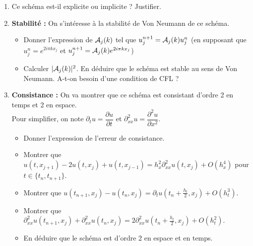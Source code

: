 \documentclass[12pt]{article}
\begin{document}
\begin{exo}
  \begin{enumerate}
  \item Ce sch\'ema est-il explicite ou implicite ? Justifier.
  \item {\bf Stabilit\'e : } On s'int\'eresse \`a la stabilit\'e de Von Neumann de ce sch\'ema.
    \begin{itemize}
    \item Donner l'expression de $\mathcal{A}_j(k)$ tel que $u_j^{n+1} = \mathcal{A}_j(k) u_j^n$
      (en supposant que $u_j^n = e^{2i \pi k x_j}$ et $u_j^{n+1} = \mathcal{A}_j(k) e^{2i \pi k x_j}$)
    \item Calculer $| \mathcal{A}_j(k) |^2$. En d\'eduire que le sch\'ema est stable au sens
      de Von Neumann. A-t-on besoin d'une condition de CFL ?
    \end{itemize}
  \item {\bf Consistance : } On va montrer que ce sch\'ema est consistant d'ordre 2 en temps
    et 2 en espace. \\
    Pour simplifier, on note $\partial_t u = \dfrac{\partial u}{\partial t}$
    et $\partial_{xx}^2 u = \dfrac{\partial^2 u}{\partial x^2}$.
    \begin{itemize}
    \item Donner l'expression de l'erreur de consistance.
    \item Montrer que $u(t,x_{j+1}) - 2 u(t,x_j) + u(t,x_{j-1}) = h_x^2 \partial_{xx}^2 u(t,x_j) + O(h_x^4)$
      pour $t \in \{ t_n , t_{n+1} \}$.
    \item Montrer que $u(t_{n+1},x_j) - u(t_n,x_j) = \partial_t u(t_{n} + \frac{h_t}2 , x_j)
      + O(h_t^3)$.
    \item Montrer que $\partial_{xx}^2 u(t_{n+1},x_j) + \partial_{xx}^2 u(t_{n},x_j)
      = 2 \partial_{xx}^2 u(t_{n} + \frac{h_t}{2},x_j) + O(h_t^2)$.
    \item En d\'eduire que le sch\'ema est d'ordre 2 en espace et en temps.
    \end{itemize}
    
  \end{enumerate}
\end{exo}

\newpage
\end{document}
